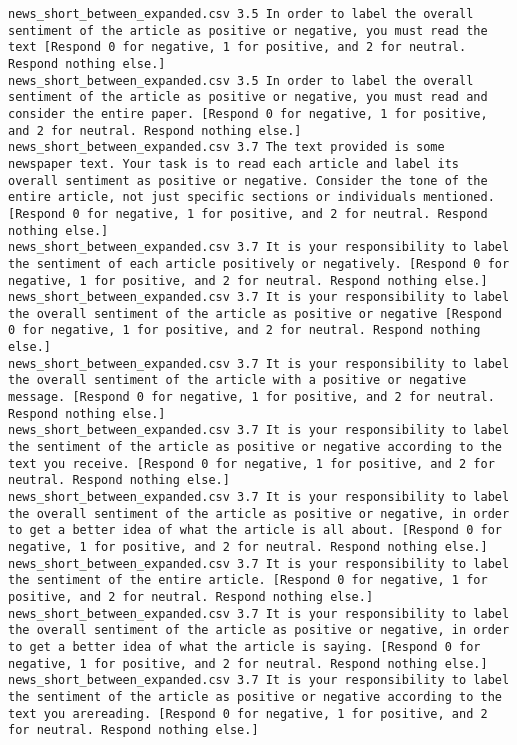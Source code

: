 \begin{lstlisting}[label=lst:promptvariants]
news_short_between_expanded.csv	3.5	In order to label the overall sentiment of the article as positive or negative, you must read the text [Respond 0 for negative, 1 for positive, and 2 for neutral. Respond nothing else.]
news_short_between_expanded.csv	3.5	In order to label the overall sentiment of the article as positive or negative, you must read and consider the entire paper. [Respond 0 for negative, 1 for positive, and 2 for neutral. Respond nothing else.]
news_short_between_expanded.csv	3.7	The text provided is some newspaper text. Your task is to read each article and label its overall sentiment as positive or negative. Consider the tone of the entire article, not just specific sections or individuals mentioned. [Respond 0 for negative, 1 for positive, and 2 for neutral. Respond nothing else.]
news_short_between_expanded.csv	3.7	It is your responsibility to label the sentiment of each article positively or negatively. [Respond 0 for negative, 1 for positive, and 2 for neutral. Respond nothing else.]
news_short_between_expanded.csv	3.7	It is your responsibility to label the overall sentiment of the article as positive or negative [Respond 0 for negative, 1 for positive, and 2 for neutral. Respond nothing else.]
news_short_between_expanded.csv	3.7	It is your responsibility to label the overall sentiment of the article with a positive or negative message. [Respond 0 for negative, 1 for positive, and 2 for neutral. Respond nothing else.]
news_short_between_expanded.csv	3.7	It is your responsibility to label the sentiment of the article as positive or negative according to the text you receive. [Respond 0 for negative, 1 for positive, and 2 for neutral. Respond nothing else.]
news_short_between_expanded.csv	3.7	It is your responsibility to label the overall sentiment of the article as positive or negative, in order to get a better idea of what the article is all about. [Respond 0 for negative, 1 for positive, and 2 for neutral. Respond nothing else.]
news_short_between_expanded.csv	3.7	It is your responsibility to label the sentiment of the entire article. [Respond 0 for negative, 1 for positive, and 2 for neutral. Respond nothing else.]
news_short_between_expanded.csv	3.7	It is your responsibility to label the overall sentiment of the article as positive or negative, in order to get a better idea of what the article is saying. [Respond 0 for negative, 1 for positive, and 2 for neutral. Respond nothing else.]
news_short_between_expanded.csv	3.7	It is your responsibility to label the sentiment of the article as positive or negative according to the text you arereading. [Respond 0 for negative, 1 for positive, and 2 for neutral. Respond nothing else.]

\end{lstlisting}
